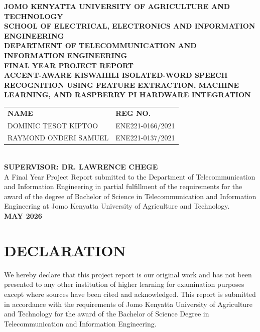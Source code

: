 \documentclass[12pt,a4paper]{report}
\begin{document}
\begin{titlepage}
\centering
\textbf{JOMO KENYATTA UNIVERSITY OF AGRICULTURE AND TECHNOLOGY}\\[0.4cm]
\textbf{SCHOOL OF ELECTRICAL, ELECTRONICS AND INFORMATION ENGINEERING}\\[0.4cm]
\textbf{DEPARTMENT OF TELECOMMUNICATION AND INFORMATION ENGINEERING}\\[1.2cm]

\textbf{FINAL YEAR PROJECT REPORT}\\[1.2cm]

\textbf{\Large ACCENT-AWARE KISWAHILI ISOLATED-WORD SPEECH RECOGNITION USING FEATURE EXTRACTION, MACHINE LEARNING, AND RASPBERRY PI HARDWARE INTEGRATION}\\[1.5cm]

\begin{tabular}{ll}
\textbf{NAME} & \textbf{REG NO.}\\
DOMINIC TESOT KIPTOO & ENE221-0166/2021\\
RAYMOND ONDERI SAMUEL & ENE221-0137/2021\\
\end{tabular}\\[1.2cm]

\textbf{SUPERVISOR: DR. LAWRENCE CHEGE}\\[1.2cm]

A Final Year Project Report submitted to the Department of Telecommunication and Information Engineering in partial fulfillment of the requirements for the award of the degree of Bachelor of Science in Telecommunication and Information Engineering at Jomo Kenyatta University of Agriculture and Technology.\\[1.5cm]

\textbf{MAY 2026}
\end{titlepage}


\chapter*{DECLARATION}
We hereby declare that this project report is our original work and has not been presented to any other institution of higher learning for examination purposes except where sources have been cited and acknowledged. This report is submitted in accordance with the requirements of Jomo Kenyatta University of Agriculture and Technology for the award of the Bachelor of Science Degree in Telecommunication and Information Engineering.
\end{document}
